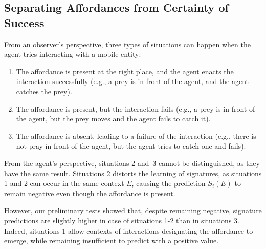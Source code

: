 \documentclass[conference]{IEEEtran}
\begin{document}


\subsection{Separating Affordances from Certainty of Success}\label{separate}

From an observer's perspective, three types of situations can happen when the agent tries interacting with a mobile entity:

\begin{enumerate}
\item The affordance is present at the right place, and the agent enacts the interaction successfully (e.g., a prey is in front of the agent, and the agent catches the prey).
\item The affordance is present, but the interaction fails (e.g., a prey is in front of the agent, but the prey moves and the agent fails to catch it).
\item The affordance is absent, leading to a failure of the interaction (e.g., there is not pray in front of the agent, but the agent tries to catch one and fails).
\end{enumerate}

From the agent's perspective, situations 2 and~3 cannot be distinguished, as they have the same result.
Situations 2 distorts the learning of signatures, as situations 1 and 2 can occur in the same context $E$, causing the prediction $S_i(E)$ to remain negative even though the affordance is present.

However, our preliminary tests showed %
that, despite remaining negative, signature predictions are slightly higher in case of situations 1-2 than in situations 3. Indeed, situations 1 allow contexts of interactions designating the affordance to emerge, while remaining insufficient to predict with a positive value.
\end{document}
